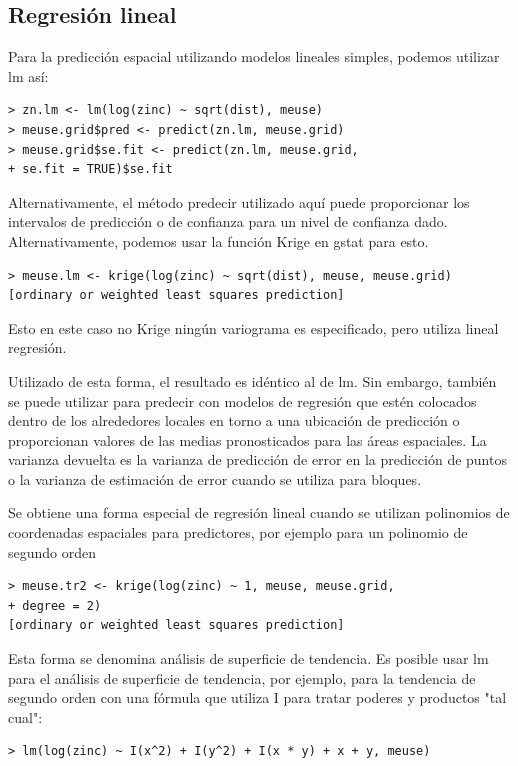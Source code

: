 \subsection{Regresión lineal}

Para la predicción espacial utilizando modelos lineales simples, podemos utilizar lm así:
\\
\begin{lstlisting}
> zn.lm <- lm(log(zinc) ~ sqrt(dist), meuse)
> meuse.grid$pred <- predict(zn.lm, meuse.grid)
> meuse.grid$se.fit <- predict(zn.lm, meuse.grid, 
+ se.fit = TRUE)$se.fit
\end{lstlisting}

Alternativamente, el método predecir utilizado aquí puede proporcionar los intervalos de predicción o de confianza
para un nivel de confianza dado. Alternativamente, podemos usar la función Krige en gstat para esto.
\\
\begin{lstlisting}
> meuse.lm <- krige(log(zinc) ~ sqrt(dist), meuse, meuse.grid)
[ordinary or weighted least squares prediction]
\end{lstlisting}

Esto en este caso no Krige ningún variograma es especificado, pero utiliza lineal
regresión.

Utilizado de esta forma, el resultado es idéntico al de lm. Sin embargo, también se puede utilizar para
predecir con modelos de regresión que estén colocados dentro de los alrededores locales en torno a una ubicación
de predicción o proporcionan valores de las medias pronosticados para las áreas espaciales. La varianza devuelta es la varianza 
de predicción de error en la predicción de puntos o la varianza de estimación de error
cuando se utiliza para bloques.

Se obtiene una forma especial de regresión lineal cuando se utilizan polinomios de coordenadas espaciales para predictores,
por ejemplo para un polinomio de segundo orden
\\
\begin{lstlisting}
> meuse.tr2 <- krige(log(zinc) ~ 1, meuse, meuse.grid,
+ degree = 2)
[ordinary or weighted least squares prediction]
\end{lstlisting}

Esta forma se denomina análisis de superficie de tendencia. Es posible usar lm para el análisis de superficie
de tendencia, por ejemplo, para la tendencia de segundo orden con una fórmula que utiliza I para tratar poderes y productos "tal cual":
\\
\begin{lstlisting}
> lm(log(zinc) ~ I(x^2) + I(y^2) + I(x * y) + x + y, meuse)
\end{lstlisting}


